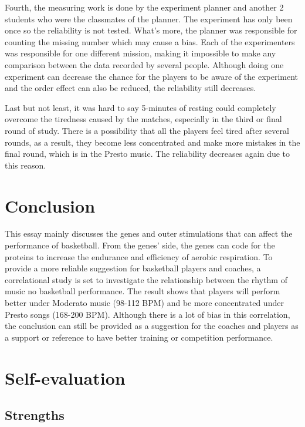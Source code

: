 \documentclass[man,floatsintext]{apa7}
\begin{document}
Fourth, the measuring work is done by the experiment planner and another 2 students who were the classmates of the planner. The experiment has only been once so the reliability is not tested. What's more, the planner was responsible for counting the missing number which may cause a bias. Each of the experimenters was responsible for one different mission, making it impossible to make any comparison between the data recorded by several people. Although doing one experiment can decrease the chance for the players to be aware of the experiment and the order effect can also be reduced, the reliability still decreases.

Last but not least, it was hard to say 5-minutes of resting could completely overcome the tiredness caused by the matches, especially in the third or final round of study. There is a possibility that all the players feel tired after several rounds, as a result, they become less concentrated and make more mistakes in the final round, which is in the Presto music. The reliability decreases again due to this reason.

\section{Conclusion}

This essay mainly discusses the genes and outer stimulations that can affect the performance of basketball. From the genes' side, the genes can code for the proteins to increase the endurance and efficiency of aerobic respiration. To provide a more reliable suggestion for basketball players and coaches, a correlational study is set to investigate the relationship between the rhythm of music no basketball performance. The result shows that players will perform better under Moderato music (98-112 BPM) and be more concentrated under Presto songs (168-200 BPM). Although there is a lot of bias in this correlation, the conclusion can still be provided as a suggestion for the coaches and players as a support or reference to have better training or competition performance.

\section{Self-evaluation}

\subsection{Strengths}
\end{document}
